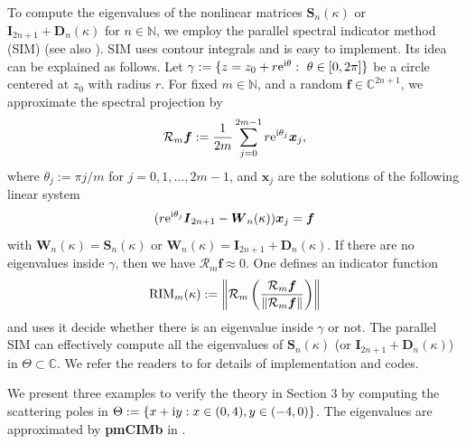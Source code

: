 \documentclass{article}
\renewcommand{\vec}[1]{\boldsymbol{#1}}
\newcommand{\set}[1]{\left\{#1\right\}}
\renewcommand{\vec}[1]{\boldsymbol{#1}}
\begin{document}
	To compute the eigenvalues of the nonlinear matrices $\vec{S}_n(\kappa)$ or $\vec{I}_{2n+1}+\vec{D}_n(\kappa)$ for $n\in\mathbb{N}$,  we employ the parallel spectral indicator method (SIM) \cite{XiSun2024arXiv} (see also \cite{Beyn2012LAA, Beyn2014, HuangEtal2016JCP, Huang2018}). SIM uses contour integrals and is easy to implement. Its idea can be explained as follows. Let $\gamma:=\{z=z_0+r{\rm e}^{{\rm i }\theta}:~\theta\in[0,2\pi]\}$ be a circle centered at $z_0$ with radius $r$. For fixed $m\in\mathbb{N}$, and a random $\vec{f}\in\mathbb{C}^{2n+1}$, we approximate the spectral projection  by 
	\begin{equation*}
		\mathcal{R}_m \vec{f}:=\dfrac{1}{2m}\sum_{j=0}^{2m-1}r{\rm e}^{{\rm i }\theta_j}\vec{x}_j,
	\end{equation*}
	where $\theta_j:=\pi j/m$ for $j=0, 1, \ldots, 2m-1$, and $\vec{x}_j$ are the solutions of the following linear system
	\begin{equation*}
		(r{\rm e}^{{\rm i }\theta_j}\vec{I}_{2n+1}-\vec{W}_{ n}(\kappa))\vec{x}_j=\vec{f}
	\end{equation*} 
	with $\vec{W}_{ n}(\kappa)=\vec{S}_n(\kappa)$ or $\vec{W}_{ n}(\kappa)=\vec{I}_{2n+1}+\vec{D}_n(\kappa)$. If there are no eigenvalues inside $\gamma$,  then we  have $\mathcal{R}_m\vec{f} \approx 0$. One defines an indicator function
	\begin{equation*}
		{\rm  RIM}_m(\kappa):=\left\|\mathcal{R}_m\left(\dfrac{\mathcal{R}_m\vec{f}}{\|\mathcal{R}_m\vec{f}\|}\right)\right\|
	\end{equation*}
	and uses it decide whether there is an eigenvalue inside $\gamma$ or not. The parallel SIM can effectively compute all the eigenvalues of $\vec{S}_n(\kappa)$ (or $\vec{I}_{2n+1}+\vec{D}_n(\kappa)$) in $\Theta \subset \mathbb C$. We refer the readers to \cite{XiSun2024arXiv} for details of implementation and codes. 
	
	We present three examples to verify the theory in Section 3 by computing the scattering poles in  $\Theta:=\set{x+{\rm i}y: x\in(0,4), y\in(-4,0)}$. The eigenvalues are approximated by {\bf pmCIMb} in \cite{XiSun2024arXiv}.
	
\end{document}
